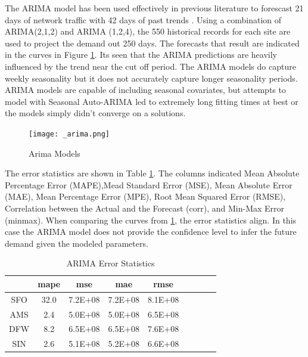\documentclass[conference]{IEEEtran}
\begin{document}
The ARIMA model has been used effectively in previous literature to forescast 21 days of network traffic with 42 days of past trends \cite{Zhuang}. Using a combination of ARIMA(2,1,2) and ARIMA (1,2,4), the 550 historical records for each site are used to project the demand out 250 days. The forecasts that result are indicated in the curves in Figure \ref{arima}. Its seen that the ARIMA predictions are heavily influenced by the trend near the cut off period. The ARIMA models do capture weekly seasonality but it does not accurately capture longer seasonality periods. ARIMA models are capable of including seasonal covariates, but attempts to model with Seasonal Auto-ARIMA led to extremely long fitting times at best or the models simply didn't converge on a solutions.

\begin{figure}[htbp]
\centering
\texttt{[image: \_arima.png]}
\caption{Arima Models}
\label{arima}
\end{figure}

The error statistics are shown in Table \ref{arima_err}. The columns indicated Mean Absolute Percentage Error (MAPE),Mead Standard Error (MSE), Mean Absolute Error (MAE), Mean Percentage Error (MPE), Root Mean Squared Error (RMSE), Correlation between the Actual and the Forecast (corr), and Min-Max Error (minmax). When comparing the curves from \ref{arima}, the error statistics align. In this case the ARIMA model does not provide the confidence level to infer the future demand given the modeled parameters. 



\begin{tiny}
\begin{table}[htbp]
\caption{ARIMA Error Statistics}
\begin{center}
\begin{tabular}{|c|c|c|c|c|c|c|c|c|}

\hline

{}     &mape   &     mse &   mae     &      rmse    \\
\hline
SFO    & 32.0  & 7.2E+08 & 7.2E+08   &   8.1E+08    \\
AMS    & 2.4   & 5.0E+08 & 5.0E+08   &   6.5E+08    \\
DFW    & 8.2   & 6.5E+08 & 6.5E+08   &   7.6E+08    \\
SIN    & 2.6   & 5.1E+08 & 5.2E+08   &   6.6E+08    \\
\hline
\end{tabular}
\label{arima_err}
\end{center}
\end{table}
\end{tiny}
\end{document}
